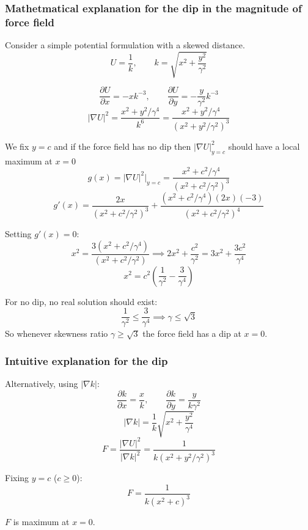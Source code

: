 \subsubsection{Mathetmatical explanation for the dip in the magnitude of force field}
Consider a simple potential formulation with a skewed distance.
\[
U = \frac{1}{k}, \qquad k = \sqrt{x^2 + \frac{y^2}{\gamma^2}}
\]

\[
\frac{\partial U}{\partial x} = -xk^{-3}, \qquad
\frac{\partial U}{\partial y} = -\frac{y}{\gamma^2}k^{-3}
\]
\[
|\nabla U|^2 = \frac{x^2 + y^2/\gamma^4}{k^6}
= \frac{x^2 + y^2/\gamma^4}{(x^2+y^2/\gamma^2)^3}
\]

We fix $y=c$ and if the force field has no dip then $|\nabla U|^2_{y=c}$ should have a local maximum at $x=0$
\[
g(x) = |\nabla U|^2\Big|_{y=c} = \frac{x^2 + c^2/\gamma^4}{(x^2+c^2/\gamma^2)^3}
\]
\[
g'(x) = \frac{2x}{(x^2+c^2/\gamma^2)^3} + \frac{(x^2+c^2/\gamma^4)(2x)(-3)}{(x^2+c^2/\gamma^2)^4}
\]

Setting $g'(x)=0$:
\[
x^2 = \frac{3(x^2+c^2/\gamma^4)}{(x^2+c^2/\gamma^2)}
\implies 2x^2 + \frac{c^2}{\gamma^2} = 3x^2 + \frac{3c^2}{\gamma^4}
\]
\[
x^2 = c^2\left(\frac{1}{\gamma^2} - \frac{3}{\gamma^4}\right)
\]

For no dip, no real solution should exist:
\[
\frac{1}{\gamma^2} \le \frac{3}{\gamma^4} \implies \gamma \le \sqrt{3}
\]
So whenever skewness ratio $\gamma\ge \sqrt{3}$ the force field has a dip at $x=0$.

\subsubsection{Intuitive explanation for the dip}


Alternatively, using $|\nabla k|$:
\[
\frac{\partial k}{\partial x} = \frac{x}{k}, \qquad
\frac{\partial k}{\partial y} = \frac{y}{k\gamma^2}
\]
\[
|\nabla k| = \frac{1}{k}\sqrt{x^2 + \frac{y^2}{\gamma^4}}
\]
\[
F = \frac{|\nabla U|^2}{|\nabla k|^2} = \frac{1}{k(x^2+y^2/\gamma^2)^3}
\]

Fixing $y=c$ ($c \ge 0$):
\[
F = \frac{1}{k(x^2+c)^3}
\]

$F$ is maximum at $x=0$.
